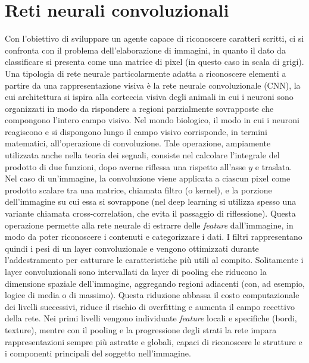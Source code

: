 \documentclass[a4paper,12pt]{article}
\begin{document}
\section{Reti neurali convoluzionali}\label{cnn}
Con l'obiettivo di sviluppare un agente capace di riconoscere caratteri scritti, ci si confronta con il problema dell'elaborazione di immagini, in quanto il dato da classificare si presenta come una matrice di pixel (in questo caso in scala di grigi).
Una tipologia di rete neurale particolarmente adatta a riconoscere elementi a partire da una rappresentazione visiva è la rete neurale convoluzionale (CNN), la cui architettura si ispira alla corteccia visiva degli animali in cui i neuroni sono organizzati in modo da rispondere a regioni parzialmente sovrapposte che compongono l'intero campo visivo.
Nel mondo biologico, il modo in cui i neuroni reagiscono e si dispongono lungo il campo visivo corrisponde, in termini matematici, all'operazione di convoluzione.
Tale operazione, ampiamente utilizzata anche nella teoria dei segnali, consiste nel calcolare l'integrale del prodotto di due funzioni, dopo averne riflessa una rispetto all'asse $y$ e traslata.
Nel caso di un'immagine, la convoluzione viene applicata a ciascun pixel come prodotto scalare tra una matrice, chiamata filtro (o kernel), e la porzione dell'immagine su cui essa si sovrappone (nel deep learning si utilizza spesso una variante chiamata cross-correlation, che evita il passaggio di riflessione).
Questa operazione permette alla rete neurale di estrarre delle \textit{feature} dall'immagine, in modo da poter riconoscere i contenuti e categorizzare i dati.
I filtri rappresentano quindi i pesi di un layer convoluzionale e vengono ottimizzati durante l'addestramento per catturare le caratteristiche più utili al compito.
Solitamente i layer convoluzionali sono intervallati da layer di pooling che riducono la dimensione spaziale dell'immagine, aggregando regioni adiacenti (con, ad esempio, logice di media o di massimo). Questa riduzione abbassa il costo computazionale dei livelli successivi, riduce il rischio di overfitting e aumenta il campo recettivo della rete.
Nei primi livelli vengono individuate \textit{feature} locali e specifiche (bordi, texture), mentre con il pooling e la progressione degli strati la rete impara rappresentazioni sempre più astratte e globali, capaci di riconoscere le strutture e i componenti principali del soggetto nell'immagine.
\end{document}
